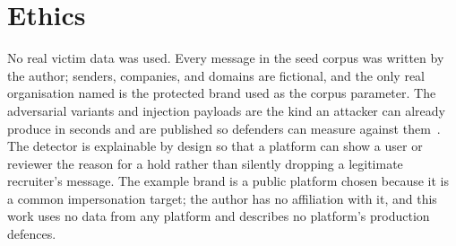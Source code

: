 \documentclass[10pt,twocolumn]{article}
\begin{document}
\section{Ethics}
\label{sec:ethics}

No real victim data was used. Every message in the seed corpus was written by the author; senders, companies, and domains are fictional, and the only real organisation named is the protected brand used as the corpus parameter. The adversarial variants and injection payloads are the kind an attacker can already produce in seconds and are published so defenders can measure against them~\cite{yang2025fraudr1,pajola2025ephishgen}. The detector is explainable by design so that a platform can show a user or reviewer the reason for a hold rather than silently dropping a legitimate recruiter's message. The example brand is a public platform chosen because it is a common impersonation target; the author has no affiliation with it, and this work uses no data from any platform and describes no platform's production defences.

{\footnotesize\setlength{\bibsep}{2.5pt}

}
\end{document}
